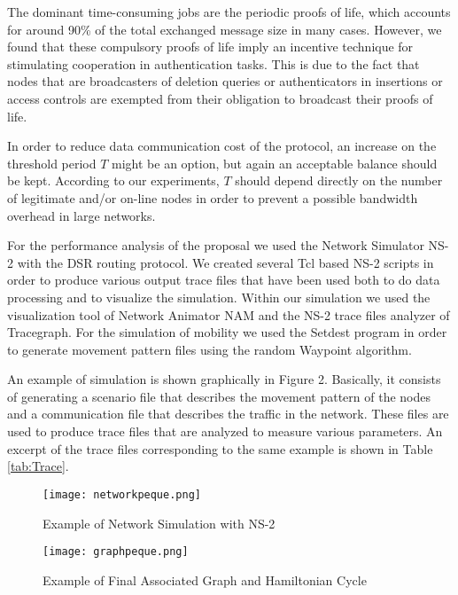 \documentclass[conference]{IEEEtran}
\begin{document}
The dominant time-consuming jobs are the periodic proofs of life, which accounts for around 90\% of the
total exchanged message size in many cases. However, we found
that these compulsory proofs of life imply an incentive technique
for stimulating cooperation in authentication tasks. This is due
to the fact that nodes that are broadcasters of deletion queries or
authenticators in insertions or access controls  are exempted from
their obligation to broadcast their proofs of life.

In order to reduce  data communication cost of the protocol, an
increase on the threshold period $T$ might be an option, but again
an acceptable balance should be kept. According to our
experiments, $T$ should depend directly on the number of
legitimate and/or on-line nodes in order to prevent a possible
bandwidth overhead in large networks.

For the performance analysis of the proposal we used the Network 
Simulator NS-2 with the DSR routing protocol.  We created several Tcl
based NS-2 scripts in order to produce various output trace files
that have been used both to do data processing and to visualize
the simulation. Within our simulation we  used the visualization
tool of Network Animator NAM  and the NS-2 trace files analyzer of
Tracegraph. For the simulation of mobility we used the Setdest
program in order to generate movement pattern files using the
random Waypoint algorithm.

An example of simulation is shown graphically in Figure
2. Basically, it consists of generating a scenario file that
describes the movement pattern of the nodes and a communication
file that describes the traffic in the network. These files are
used to produce trace files that are analyzed to measure various
parameters. An excerpt of the trace files corresponding to the
same example is shown in Table \ref{tab:Trace}.

\begin{figure*}[htb]
  \centering
     \texttt{[image: networkpeque.png]}
  \caption{Example of Network Simulation with NS-2}
  \label{fig:NS}
\end{figure*}


\begin{figure*}[htb]
  \centering
     \texttt{[image: graphpeque.png]}
  \caption{Example of Final Associated Graph and Hamiltonian Cycle} \label{fig:Graph}
  \vspace{-0.2cm}
\end{figure*}
\end{document}
